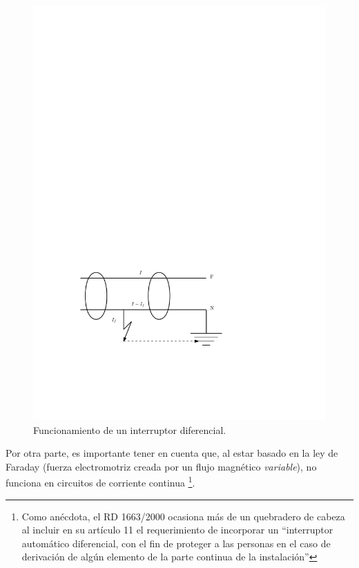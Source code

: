 %
\begin{figure}
\begin{centering}
\includegraphics[scale=0.68]{../figs/InterruptorDiferencial}
\end{centering}

\caption{Funcionamiento de un interruptor diferencial.\label{fig:FuncionamientoDiferencial}}

\end{figure}


Por otra parte, es importante tener en cuenta que, al estar basado
en la ley de Faraday (fuerza electromotriz creada por un flujo magnético
\emph{variable}), no funciona en circuitos de corriente continua%
\footnote{Como anécdota, el RD 1663/2000 \cite{RealDecreto2000} ocasiona más
de un quebradero de cabeza al incluir en su artículo 11 el requerimiento
de incorporar un {}``interruptor automático diferencial, con el fin
de proteger a las personas en el caso de derivación de algún elemento
de la parte continua de la instalación''%
}. 


